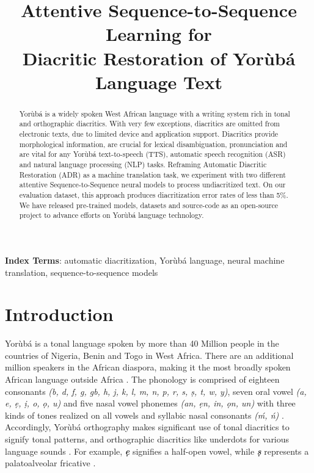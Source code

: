 \documentclass[a4paper]{article}
\title{Attentive Sequence-to-Sequence Learning for \\
  Diacritic Restoration of Yor{\`u}b{\'a} Language Text}
\begin{document}
\maketitle
% 
\begin{abstract}
Yor{\`u}b{\'a} is a widely spoken West African language with a writing system rich in tonal and orthographic diacritics. With very few exceptions, diacritics are omitted from electronic texts, due to limited device and application support. Diacritics provide morphological information, are crucial for lexical disambiguation, pronunciation and are vital for any Yor{\`u}b{\'a} text-to-speech (TTS), automatic speech recognition (ASR) and natural language processing (NLP) tasks. Reframing Automatic Diacritic Restoration (ADR) as a machine translation task, we experiment with two different attentive Sequence-to-Sequence neural models to process undiacritized text. On our evaluation dataset, this approach produces diacritization error rates of less than 5\%. We have released pre-trained models, datasets and source-code as an open-source project to advance efforts on Yor{\`u}b{\'a} language technology.
\end{abstract}
\noindent\textbf{Index Terms}: automatic diacritization, Yor{\`u}b{\'a} language, neural machine translation, sequence-to-sequence models
\section{Introduction}

Yor{\`u}b{\'a} is a tonal language spoken by more than 40 Million people in the countries of Nigeria, Benin and Togo in West Africa. There are an additional million speakers in the African diaspora, making it the most broadly spoken African language outside Africa \cite{yoruba_language}. The phonology is comprised of eighteen consonants \emph{({b}, {d}, {f}, {g}, {gb}, {h}, {j}, {k}, {l}, {m}, {n}, {p}, {r}, {s}, \d{s}, {t}, {w}, y)}, seven oral vowel \emph{({a}, {e}, \d{e}, \d{i}, {o}, \d{o}, {u})} and five nasal vowel phonemes \emph{({an}, \d{e}{n}, {in}, \d{o}{n}, {un})} with three kinds of tones realized on all vowels and syllabic nasal consonants \emph{({\'m}, {\'n})} \cite{akinlabi2004sound}. Accordingly, Yor{\`u}b{\'a} orthography makes significant use of tonal diacritics to signify tonal patterns, and orthographic diacritics like underdots for various language sounds \cite{adegbola2012quantifying}. For example, \emph{\textbf{\d{e}}} signifies a half-open vowel, while \emph{\textbf{\d{s}}} represents a palatoalveolar fricative \cite{wells2000orthographic}.
\end{document}
